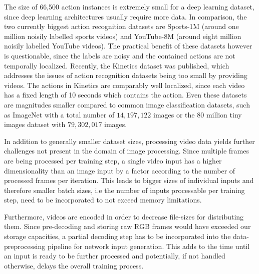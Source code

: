 The size of 66,500 action instances is extremely small for a deep learning dataset, since deep learning architectures usually require more data.
In comparison, the two currently biggest action recognition datasets are Sports-1M\cite{karpathy_large-scale_2014} (around one million noisily labelled sports videos) and YouTube-8M\cite{abu-el-haija_youtube-8m:_2016} (around eight million noisily labelled YouTube videos).
The practical benefit of these datasets however is questionable, since the labels are noisy and the contained actions are not temporally localized.
Recently, the Kinetics dataset was published, which addresses the issues of action recognition datasets being too small by providing  videos.
The actions in Kinetics are comparably well localized, since each video has a fixed length of 10 seconds which contains the action.
Even these datasets are magnitudes smaller compared to common image classification datasets, such as ImageNet\cite{deng_imagenet:_2009} with a total number of $14,197,122$ images or the 80 million tiny images dataset\cite{torralba_80_2008} with $79,302,017$ images.

In addition to generally smaller dataset sizes, processing video data yields further challenges not present in the domain of image processing.
Since multiple frames are being processed per training step, a single video input has a higher dimensionality than an image input by a factor according to the number of processed frames per iteration.
This leads to bigger sizes of individual inputs and therefore smaller batch sizes, i.e the number of inputs processable per training step, need to be incorporated to not exceed memory limitations.

Furthermore, videos are encoded in order to decrease file-sizes for distributing them.
Since pre-decoding and storing raw RGB frames would have exceeded our storage capacities, a partial decoding step has to be incorporated into the data-preprocessing pipeline for network input generation.
This adds to the time until an input is ready to be further processed and potentially, if not handled otherwise, delays the overall training process.


